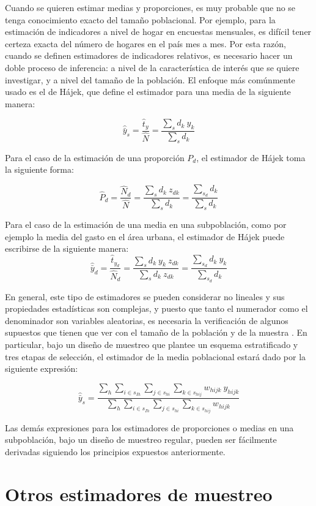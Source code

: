 \documentclass[
  12pt,
  spanish,
]{book}
\begin{document}
Cuando se quieren estimar medias y proporciones, es muy probable que no se tenga conocimiento exacto del tamaño poblacional. Por ejemplo, para la estimación de indicadores a nivel de hogar en encuestas mensuales, es difícil tener certeza exacta del número de hogares en el país mes a mes. Por esta razón, cuando se definen estimadores de indicadores relativos, es necesario hacer un doble proceso de inferencia: a nivel de la característica de interés que se quiere investigar, y a nivel del tamaño de la población. El enfoque más comúnmente usado es el de Hájek, que define el estimador para una media de la siguiente manera:

\[
\hat{\bar{y}}_s=\frac{\hat t_y}{\hat N} = \frac{\sum_sd_k\ y_{k}}{\sum_sd_k}
\]

Para el caso de la estimación de una proporción \(P_d\), el estimador de Hájek toma la siguiente forma:

\[
\hat{P}_d=\frac{\hat N_d}{\hat N} = \frac{\sum_{s}d_k\ z_{dk}}{\sum_sd_k} = \frac{\sum_{s_d}d_k}{\sum_s d_k}
\]

Para el caso de la estimación de una media en una subpoblación, como por ejemplo la media del gasto en el área urbana, el estimador de Hájek puede escribirse de la siguiente manera:
\[
\hat{\bar{y}}_d=\frac{\hat t_{y_d}}{\hat N_d} = \frac{\sum_s d_k\ y_{k} \ z_{dk} }{\sum_s d_k \ z_{dk}} = \frac{\sum_{s_d} d_k\ y_{k}}{\sum_{s_d} d_k}
\]

En general, este tipo de estimadores se pueden considerar no lineales y sus propiedades estadísticas son complejas, y puesto que tanto el numerador como el denominador son variables aleatorias, es necesaria la verificación de algunos supuestos que tienen que ver con el tamaño de la población y de la muestra \citep{Gutierrez_2016}. En particular, bajo un diseño de muestreo que plantee un esquema estratificado y tres etapas de selección, el estimador de la media poblacional estará dado por la siguiente expresión:

\[
\hat{\bar{y}}_s=\frac{\sum_h \sum_{i \in s_{Ih}} \sum_{j \in s_{hi}} \sum_{k \in s_{hij}} w_{hijk} \ y_{hijk}}{\sum_h \sum_{i \in s_{Ih}} \sum_{j \in s_{hi}} \sum_{k \in s_{hij}} w_{hijk} }
\]

Las demás expresiones para los estimadores de proporciones o medias en una subpoblación, bajo un diseño de muestreo regular, pueden ser fácilmente derivadas siguiendo los principios expuestos anteriormente.

\hypertarget{otros-estimadores-de-muestreo}{%
\section{Otros estimadores de muestreo}\label{otros-estimadores-de-muestreo}}
\end{document}
